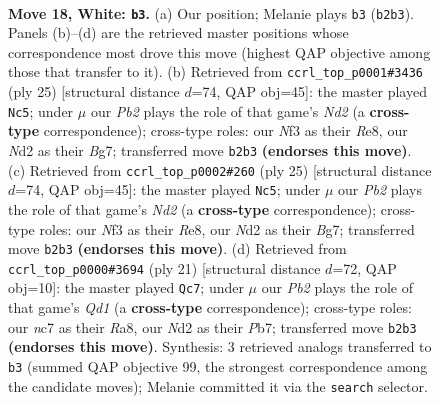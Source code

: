 \documentclass[11pt]{article}
\begin{document}
\clearpage

\begin{figure}[p]\centering
\begin{subfigure}{0.46\textwidth}\centering
\resizebox{\linewidth}{!}{%
\newchessgame
\chessboard[
  setfen={1rbq1r1k/p1n1b2p/1pp2np1/3p1p2/3P1P2/P4NP1/QP1NP1BP/R1B1R1K1 w - - 4 18},
  showmover=false,
  pgfstyle=straightmove, color=movearrow, markmove={b2-b3}
]}
\caption{}
\end{subfigure}\hfill
\begin{subfigure}{0.46\textwidth}\centering
\resizebox{\linewidth}{!}{%
\newchessgame
\chessboard[
  setfen={r1b1r1k1/1p1nqpbp/2pp1np1/p7/2PNPB2/2N3PP/PPQ2PB1/R2R2K1 b - - 0 13},
  showmover=false,
  pgfstyle=straightmove, color=movearrow, markmove={d7-c5}
]}
\caption{}
\end{subfigure}
\\[4pt]
\begin{subfigure}{0.46\textwidth}\centering
\resizebox{\linewidth}{!}{%
\newchessgame
\chessboard[
  setfen={r1b1r1k1/1p1nqpbp/2pp1np1/p7/2PNPB2/2N3PP/PPQ2PB1/R2R2K1 b - - 0 13},
  showmover=false,
  pgfstyle=straightmove, color=movearrow, markmove={d7-c5}
]}
\caption{}
\end{subfigure}\hfill
\begin{subfigure}{0.46\textwidth}\centering
\resizebox{\linewidth}{!}{%
\newchessgame
\chessboard[
  setfen={r2q1rk1/pp1bppbp/2np1np1/8/3NP3/2P1BPP1/PP2Q1BP/RN3RK1 b - - 2 11},
  showmover=false,
  pgfstyle=straightmove, color=movearrow, markmove={d8-c7}
]}
\caption{}
\end{subfigure}
\caption{\textbf{Move 18, White: \texttt{b3}.} (a) Our position; Melanie plays \texttt{b3} (\texttt{b2b3}). Panels (b)--(d) are the retrieved master positions whose correspondence most drove this move (highest QAP objective among those that transfer to it). (b) Retrieved from \texttt{ccrl\_top\_p0001\#3436} (ply 25) [structural distance $d$=74, QAP obj=45]: the master played \texttt{Nc5}; under $\mu$ our \emph{Pb2} plays the role of that game's \emph{Nd2} (a \textbf{cross-type} correspondence); cross-type roles: our \emph{N}f3 as their \emph{R}e8, our \emph{N}d2 as their \emph{B}g7; transferred move \texttt{b2b3} \textbf{(endorses this move)}. (c) Retrieved from \texttt{ccrl\_top\_p0002\#260} (ply 25) [structural distance $d$=74, QAP obj=45]: the master played \texttt{Nc5}; under $\mu$ our \emph{Pb2} plays the role of that game's \emph{Nd2} (a \textbf{cross-type} correspondence); cross-type roles: our \emph{N}f3 as their \emph{R}e8, our \emph{N}d2 as their \emph{B}g7; transferred move \texttt{b2b3} \textbf{(endorses this move)}. (d) Retrieved from \texttt{ccrl\_top\_p0000\#3694} (ply 21) [structural distance $d$=72, QAP obj=10]: the master played \texttt{Qc7}; under $\mu$ our \emph{Pb2} plays the role of that game's \emph{Qd1} (a \textbf{cross-type} correspondence); cross-type roles: our \emph{n}c7 as their \emph{R}a8, our \emph{N}d2 as their \emph{P}b7; transferred move \texttt{b2b3} \textbf{(endorses this move)}. Synthesis: 3 retrieved analogs transferred to \texttt{b3} (summed QAP objective 99, the strongest correspondence among the candidate moves); Melanie committed it via the \texttt{search} selector.}

\end{figure}
\end{document}

